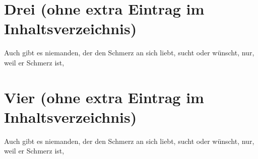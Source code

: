 \section*{Drei (ohne extra Eintrag im Inhaltsverzeichnis)}
Auch gibt es niemanden, der den Schmerz an sich liebt, sucht oder wünscht, nur, weil er Schmerz ist, 

\section*{Vier (ohne extra Eintrag im Inhaltsverzeichnis)}
Auch gibt es niemanden, der den Schmerz an sich liebt, sucht oder wünscht, nur, weil er Schmerz ist, 
